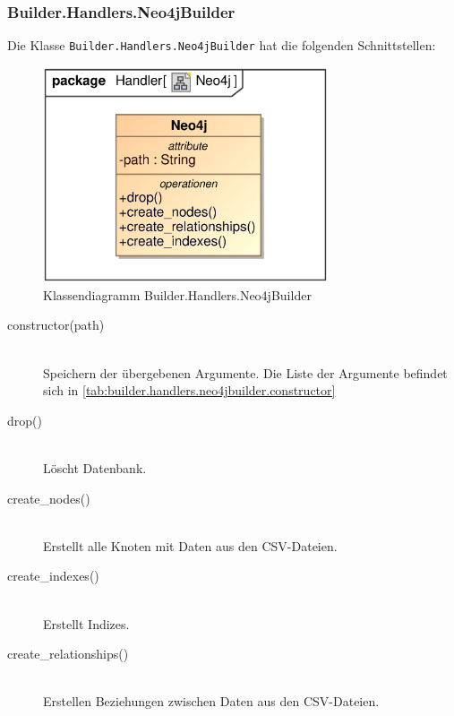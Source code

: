 \subsubsection{Builder.Handlers.Neo4jBuilder}
Die Klasse \verb|Builder.Handlers.Neo4jBuilder| hat die folgenden Schnittstellen:

\begin{figure}[H]
    \myfloatalign
    \includegraphics[width=0.75\textwidth]{gfx/MtGDeepAnalysis/Neo4j.eps}
    \caption{Klassendiagramm Builder.Handlers.Neo4jBuilder}
    \label{fig:class:builder.handlers.neo4jbuilder}
\end{figure}

\begin{description}
    \item[constructor(path)] \hfill \\
    Speichern der übergebenen Argumente. Die Liste der Argumente befindet sich in \autoref{tab:builder.handlers.neo4jbuilder.constructor}
    \item[drop()] \hfill \\
    Löscht Datenbank.
    
    \item[create\_nodes()] \hfill \\
    Erstellt alle Knoten mit Daten aus den \ac{CSV}-Dateien.
    
    \item[create\_indexes()] \hfill \\
    Erstellt Indizes.
    
    \item[create\_relationships()] \hfill \\
    Erstellen Beziehungen zwischen Daten aus den \ac{CSV}-Dateien.
\end{description}

